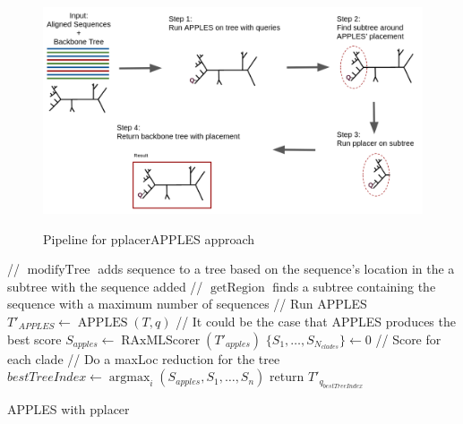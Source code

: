 \documentclass[10pt]{article}
\begin{document}
\begin{figure}[!htb]
\centering
\includegraphics[width=\textwidth]{Figs/pplacerAPPLESpipeline.png}
\label{fig:pplacerAPPLES-pipeline}
\caption{Pipeline for pplacerAPPLES approach
}
\end{figure}

\begin{algorithm}[!htb]
\SetAlgoLined
{}
 // $\operatorname{modifyTree}$ adds sequence to a tree based on the sequence's location in the a subtree with the sequence added\;
 // $\operatorname{getRegion}$ finds a subtree containing the sequence with a maximum number of sequences\;
  // Run APPLES\;
  $T'_{APPLES} \leftarrow \operatorname{APPLES}(T, q)$\;
  // It could be the case that APPLES produces the best score\;
  $S_{apples} \leftarrow \operatorname{RAxMLScorer}( T'_{apples})$\;
  $\{S_1, \dots, S_{N_{clades}}\} \leftarrow 0$ // Score for each clade\;
 // Do a maxLoc reduction for the tree\;
 $bestTreeIndex \leftarrow \operatorname{argmax}_{i} (S_{apples},S_1,\dots,S_n)$\;
 return $T'_{q_{bestTreeIndex}}$\;
\caption{APPLES with pplacer}
 \label{alg:approach2}
\end{algorithm}
\end{document}
